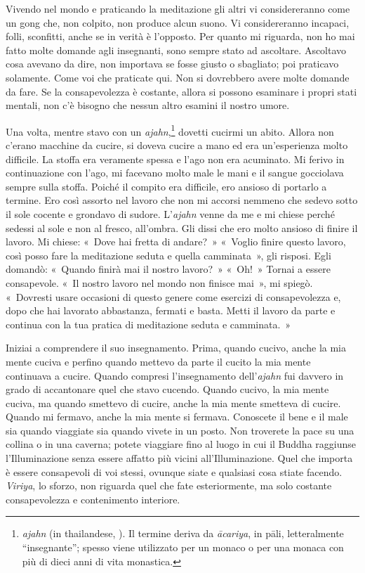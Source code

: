 Vivendo nel mondo e praticando la meditazione gli altri vi
considereranno come un gong che, non colpito, non produce alcun suono.
Vi considereranno incapaci, folli, sconfitti, anche se in verità è
l'opposto. Per quanto mi riguarda, non ho mai fatto molte domande agli
insegnanti, sono sempre stato ad ascoltare. Ascoltavo cosa avevano da
dire, non importava se fosse giusto o sbagliato; poi praticavo
solamente. Come voi che praticate qui. Non si dovrebbero avere molte
domande da fare. Se la consapevolezza è costante, allora si possono
esaminare i propri stati mentali, non c'è bisogno che nessun altro
esamini il nostro umore.

Una volta, mentre stavo con un \emph{ajahn},\footnote{\emph{ajahn} (in
  thailandese, ).
  Il termine deriva da \emph{ācariya}, in pāli, letteralmente
  ``insegnante''; spesso viene utilizzato per un monaco o per una monaca
  con più di dieci anni di vita monastica.} dovetti cucirmi un abito.
Allora non c'erano macchine da cucire, si doveva cucire a mano ed era
un'esperienza molto difficile. La stoffa era veramente spessa e l'ago
non era acuminato. Mi ferivo in continuazione con l'ago, mi facevano
molto male le mani e il sangue gocciolava sempre sulla stoffa. Poiché il
compito era difficile, ero ansioso di portarlo a termine. Ero così
assorto nel lavoro che non mi accorsi nemmeno che sedevo sotto il sole
cocente e grondavo di sudore. L'\emph{ajahn} venne da me e mi chiese
perché sedessi al sole e non al fresco, all'ombra. Gli dissi che ero
molto ansioso di finire il lavoro. Mi chiese: «~Dove hai fretta di
andare?~» «~Voglio finire questo lavoro, così posso fare la meditazione
seduta e quella camminata~», gli risposi. Egli domandò: «~Quando finirà
mai il nostro lavoro?~» «~Oh!~» Tornai a essere consapevole. «~Il nostro
lavoro nel mondo non finisce mai~», mi spiegò. «~Dovresti usare
occasioni di questo genere come esercizi di consapevolezza e, dopo che
hai lavorato abbastanza, fermati e basta. Metti il lavoro da parte e
continua con la tua pratica di meditazione seduta e camminata.~»

Iniziai a comprendere il suo insegnamento. Prima, quando cucivo, anche
la mia mente cuciva e perfino quando mettevo da parte il cucito la mia
mente continuava a cucire. Quando compresi l'insegnamento
dell'\emph{ajahn} fui davvero in grado di accantonare quel che stavo
cucendo. Quando cucivo, la mia mente cuciva, ma quando smettevo di
cucire, anche la mia mente smetteva di cucire. Quando mi fermavo, anche
la mia mente si fermava. Conoscete il bene e il male sia quando
viaggiate sia quando vivete in un posto. Non troverete la pace su una
collina o in una caverna; potete viaggiare fino al luogo in cui il
Buddha raggiunse l'Illuminazione senza essere affatto più vicini
all'Illuminazione. Quel che importa è essere consapevoli di voi stessi,
ovunque siate e qualsiasi cosa stiate facendo. \emph{Viriya}, lo sforzo,
non riguarda quel che fate esteriormente, ma solo costante
consapevolezza e contenimento interiore.

